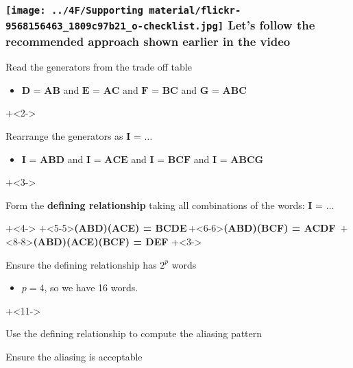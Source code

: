 \begin{frame}\frametitle{\texttt{[image: ../4F/Supporting material/flickr-9568156463\_1809c97b21\_o-checklist.jpg]} Let's follow the recommended approach shown earlier in the video}
	
	\begin{enumerate}
		\item	Read the generators from the trade off table 
			\begin{itemize}
				\item		$\textbf{D = AB}$  and $\textbf{E = AC}$ and $\textbf{F = BC}$  and $\textbf{G = ABC}$ 
			\end{itemize}
\onslide+<2->{
		\item	Rearrange the generators as  $\textbf{I = \ldots}$
			\begin{itemize}
				\item	$\textbf{I = ABD}$ and $\textbf{I = ACE}$ and $\textbf{I = BCF}$ and $\textbf{I = ABCG}$
			\end{itemize}
}
\onslide+<3->{
		\item	Form the {\color{purple}\textbf{defining relationship}} taking all combinations of the words: $\textbf{I = \ldots}$
}
\onslide+<4->{
}
\onslide+<5-5>{\textbf{(ABD)(ACE) = BCDE}}\,\onslide+<6-6>{\textbf{(ABD)(BCF) = ACDF}}\, \onslide+<8-8>{\textbf{(ABD)(ACE)(BCF) = DEF}}
\onslide+<3->{
		\item	Ensure the defining relationship has $2^p$ words
			\begin{itemize}
				\item	$p=4$, so we have 16 words.
			\end{itemize}
}
\onslide+<11->{
		\item	Use the defining relationship to compute the aliasing pattern
		\item	Ensure the aliasing is acceptable
}		
	\end{enumerate}
\end{frame}

